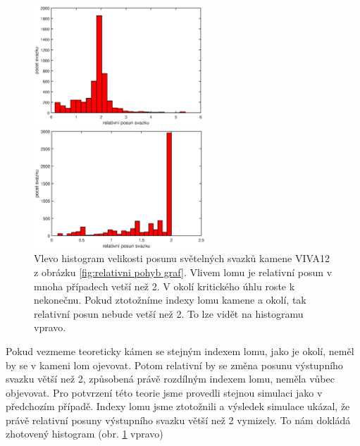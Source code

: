 \begin{figure}[h!]
 \begin{center}
 

   \begin{minipage}[c]{0.45\textwidth}
     \centering \includegraphics[height =4.5cm]{figures/relative.eps} 
   \end{minipage}
   \begin{minipage}[c]{0.45\textwidth}
     \centering \includegraphics[height =4.5cm]{figures/relative_index1.eps} 
   \end{minipage}
 \end{center}
\caption{Vlevo histogram velikosti posunu světelných svazků kamene VIVA12 z obrázku \ref{fig:relativni pohyb graf}. Vlivem lomu je relativní posun v mnoha případech vetší než 2. V okolí kritického úhlu roste k nekonečnu. Pokud ztotožníme indexy lomu kamene a okolí, tak relativní posun nebude vetší než 2. To lze vidět na histogramu vpravo.}

\label{fig:histogram relativni pohyb }

\end{figure}

Pokud vezmeme teoreticky kámen se stejným indexem lomu, jako je okolí, neměl by se v kameni lom ojevovat. Potom relativní by se změna posunu výstupního svazku větší než 2, způsobená právě rozdílným indexem lomu,  neměla vůbec objevovat. Pro potvrzení této teorie jsme provedli stejnou simulaci jako v předchozím případě. Indexy lomu jsme ztotožnili a výsledek simulace ukázal, že právě relativní posuny výstupního svazku větší než 2 vymizely. To nám dokládá zhotovený histogram (obr. \ref{fig:histogram relativni pohyb } vpravo)



